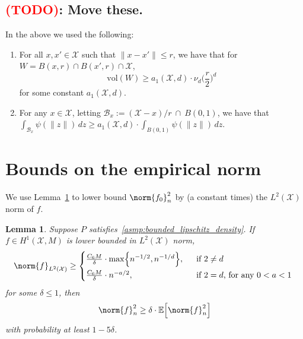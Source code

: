 \documentclass{article}
\newcommand{\vol}{\text{vol}}
\newcommand{\1}{\mathbf{1}}
\newcommand{\Xset}{\mathcal{X}}
\newcommand{\Leb}{L}
\newcommand{\mc}[1]{\mathcal{#1}}
\newcommand{\Ebb}{\mathbb{E}}
\theoremstyle{alden}
\theoremstyle{aldenthm}
\newtheorem{lemma}{Lemma}
\theoremstyle{definition}
\theoremstyle{remark}
\begin{document}
\subsection{\textcolor{red}{(TODO)}: Move these.}

In the above we used the following:
\begin{enumerate}[label=(OT\arabic*)]
	\item
	\label{asmp:r_small_1} For all $x,x' \in \Xset$ such that $\|x - x'\| \leq r$, we have that for $W = B(x,r) \cap B(x',r) \cap \Xset$,
	\begin{equation*}
	\vol(W) \geq a_1(\Xset,d) \cdot \nu_d \biggl(\frac{r}{2}\biggr)^d
	\end{equation*}
	for some constant $a_1(\Xset,d)$. 
	\item 
	\label{asmp:r_small_3} For any $x \in \Xset$, letting $\mc{B}_x:= (\Xset - x)/r~ \cap~B(0,1)$, we have that $\int_{\mc{B}_x} \psi(\|z\|) \,dz \geq a_1(\Xset,d) \cdot \int_{B(0,1)} \psi(\|z\|) \,dz$.
\end{enumerate}

\section{Bounds on the empirical norm}
\label{sec:empirical_norm}

We use Lemma~\ref{lem:empirical_norm_sobolev} to lower bound $\norm{f_0}_n^2$ by (a constant times) the $\Leb^2(\Xset)$ norm of $f$.

\begin{lemma}
	\label{lem:empirical_norm_sobolev}
	Suppose $P$ satisfies~\ref{asmp:bounded_lipschitz_density}. If $f \in H^1(\Xset,M)$ is lower bounded in $\Leb^2(\Xset)$ norm,
	\begin{equation}
	\label{eqn:empirical_norm_sobolev_1}
	\norm{f}_{\Leb^2(\Xset)} \geq 
	\begin{cases*}
	\frac{C_6 M}{\delta} \cdot \max\Bigl\{n^{-1/2},n^{-1/d}\Bigr\},& ~~\textrm{if $2 \neq d$} \\
	\frac{C_6 M}{\delta} \cdot n^{-a/2},& ~~\textrm{if $2 = d$, for any $0 < a < 1$}
	\end{cases*}
	\end{equation}
	for some $\delta \leq 1$, then
	\begin{equation}
	\label{eqn:empirical_norm_sobolev}
	\norm{f}_n^2 \geq \delta \cdot \Ebb\Bigl[\norm{f}_n^2\Bigr] 
	\end{equation}
	with probability at least $1 - 5 \delta$.
\end{lemma}
\end{document}
